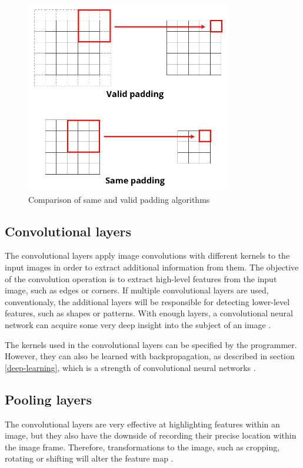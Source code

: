 \documentclass[12pt,a4paper,notitlepage]{article}
\begin{document}
\begin{figure}[htbp]
	\centering
		\includegraphics[width=0.80\textwidth]{images/padding-illustration.png}
	\caption{Comparison of same and valid padding algorithms}
	\label{fig:padding-illustration}
\end{figure}

\subsection{Convolutional layers}\label{cnn-section}
The convolutional layers apply image convolutions with different kernels to the input images in order to extract additional information from them. The objective of the convolution operation is to extract high-level features from the input image, such as edges or corners. If multiple convolutional layers are used, conventionaly, the additional layers will be responsible for detecting lower-level features, such as shapes or patterns. With enough layers, a convolutional neural network can acquire some very deep insight into the subject of an image \cite{saha_comprehensive_2018}.

The kernels used in the convolutional layers can be specified by the programmer. However, they can also be learned with backpropagation, as described in section \ref{deep-learning}, which is a strength of convolutional neural networks \cite{brownlee_gentle_2019}.

\subsection{Pooling layers}
The convolutional layers are very effective at highlighting features within an image, but they also have the downside of recording their precise location within the image frame. Therefore, transformations to the image, such as cropping, rotating or shifting will alter the feature map \cite{brownlee_gentle_2019}.
\end{document}
